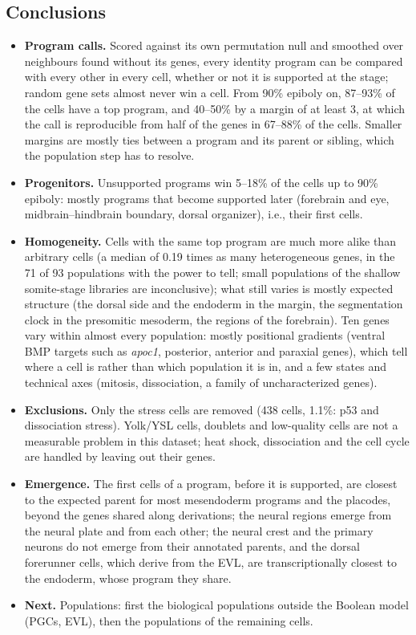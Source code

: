 \documentclass[11pt,a4paper]{article}
\begin{document}
\subsection{Conclusions}

\begin{itemize}
	\item \textbf{Program calls.} Scored against its own permutation null and smoothed over neighbours found without its genes, every identity program can be compared with every other in every cell, whether or not it is supported at the stage; random gene sets almost never win a cell. From 90\% epiboly on, 87--93\% of the cells have a top program, and 40--50\% by a margin of at least 3, at which the call is reproducible from half of the genes in 67--88\% of the cells. Smaller margins are mostly ties between a program and its parent or sibling, which the population step has to resolve.
	\item \textbf{Progenitors.} Unsupported programs win 5--18\% of the cells up to 90\% epiboly: mostly programs that become supported later (forebrain and eye, midbrain--hindbrain boundary, dorsal organizer), i.e., their first cells.
	\item \textbf{Homogeneity.} Cells with the same top program are much more alike than arbitrary cells (a median of 0.19 times as many heterogeneous genes, in the 71 of 93 populations with the power to tell; small populations of the shallow somite-stage libraries are inconclusive); what still varies is mostly expected structure (the dorsal side and the endoderm in the margin, the segmentation clock in the presomitic mesoderm, the regions of the forebrain). Ten genes vary within almost every population: mostly positional gradients (ventral BMP targets such as \emph{apoc1}, posterior, anterior and paraxial genes), which tell where a cell is rather than which population it is in, and a few states and technical axes (mitosis, dissociation, a family of uncharacterized genes).
	\item \textbf{Exclusions.} Only the stress cells are removed (438 cells, 1.1\%: p53 and dissociation stress). Yolk/YSL cells, doublets and low-quality cells are not a measurable problem in this dataset; heat shock, dissociation and the cell cycle are handled by leaving out their genes.
	\item \textbf{Emergence.} The first cells of a program, before it is supported, are closest to the expected parent for most mesendoderm programs and the placodes, beyond the genes shared along derivations; the neural regions emerge from the neural plate and from each other; the neural crest and the primary neurons do not emerge from their annotated parents, and the dorsal forerunner cells, which derive from the EVL, are transcriptionally closest to the endoderm, whose program they share.
	\item \textbf{Next.} Populations: first the biological populations outside the Boolean model (PGCs, EVL), then the populations of the remaining cells.
\end{itemize}
\end{document}
